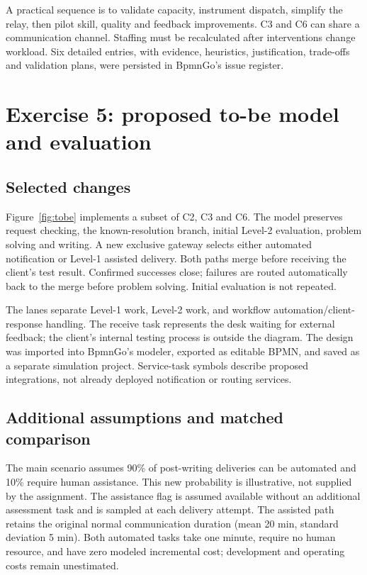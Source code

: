 \documentclass[10pt,a4paper]{article}
\begin{document}
A practical sequence is to validate capacity, instrument dispatch, simplify the
relay, then pilot skill, quality and feedback improvements. C3 and C6 can share a
communication channel. Staffing must be recalculated after interventions change
workload. Six detailed entries, with evidence, heuristics, justification, trade-offs
and validation plans, were persisted in BpmnGo's issue register.

\section{Exercise 5: proposed to-be model and evaluation}
\subsection{Selected changes}
Figure~\ref{fig:tobe} implements a subset of C2, C3 and C6. The model preserves
request checking, the known-resolution branch, initial Level-2 evaluation, problem
solving and writing. A new exclusive gateway selects either automated notification
or Level-1 assisted delivery. Both paths merge before receiving the client's test
result. Confirmed successes close; failures are routed automatically back to the
merge before problem solving. Initial evaluation is not repeated.

The lanes separate Level-1 work, Level-2 work, and workflow automation/client-response
handling. The receive task represents the desk waiting for external feedback;
the client's internal testing process is outside the diagram. The design was
imported into BpmnGo's modeler, exported as editable BPMN, and saved as a separate
simulation project. Service-task symbols describe proposed integrations, not
already deployed notification or routing services.

\subsection{Additional assumptions and matched comparison}
The main scenario assumes 90\% of post-writing deliveries can be automated and
10\% require human assistance. This new probability is illustrative, not supplied
by the assignment. The assistance flag is assumed available without an additional
assessment task and is sampled at each delivery attempt. The assisted path retains
the original normal communication duration (mean 20 min, standard deviation 5 min).
Both automated tasks take one minute, require no human resource, and have zero
modeled incremental cost; development and operating costs remain unestimated.
\end{document}
